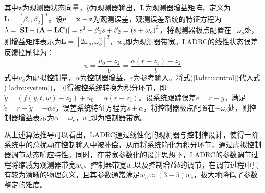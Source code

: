 其中$\mathbf{z}$为观测器状态向量，$\hat{y}$为观测器输出，$\mathbf{L}$为观测器增益矩阵，定义为$\mathbf{L}=[\beta_1, \beta_2]^T$。设$\mathbf{e}=\mathbf{x}-\mathbf{z}$为观测误差，观测误差系统的特征方程为$\lambda=\left| {\bf S I-( A-L C )} \right|=s^{2}+\beta_{1} s+\beta_{2}=\left( s+\omega_{o} \right)^{2} $，将观测器极点配置在$-\omega_{o}$处，则增益矩阵表示为$\mathbf{L}=[2\omega_o, \omega_o^2]^T$，$w_o$即为观测器带宽。LADRC的线性状态误差反馈控制律为：
\begin{equation}
	u = \frac{u_0-z_2} {b} = \frac{\alpha(r-z_1)-z_2} {b}       \label{ladrc:control}
\end{equation}
式中$u_o$为虚拟控制量，$\alpha$为控制器增益，$r$为参考输入。将式(\ref{ladrc:control})代入式(\ref{ladrc:system})，可得被控系统转换为积分环节，即$\dot{y}=(f ( y , t , w )-z_2)+u_0 = \alpha(r-z_1)$。设系统跟踪误差$e=r-y$，满足$\dot{e}=\dot{r}-\dot{y} = -\alpha e$，误差系统特征方程为$s+\alpha$，将控制器极点配置在$-\omega_c$处，则控制器增益表示为$\alpha=\omega_c$，$w_c$即为控制器带宽。

从上述算法推导可以看出，LADRC通过线性化的观测器与控制律设计，使得一阶系统中的总扰动在控制输入中被补偿，从而将系统简化为积分环节，通过虚拟控制器调节动态响应特性。同时，在带宽参数化的设计思想下，LADRC的参数调节过程将缩减为观测器带宽$w_o$、控制器带宽$w_c$以及控制增益$b$的调节，在调节过程中具有较为清晰的物理意义，且其参数通常满足$w_o \approx (3-5)w_c$，极大地降低了参数整定的难度。

